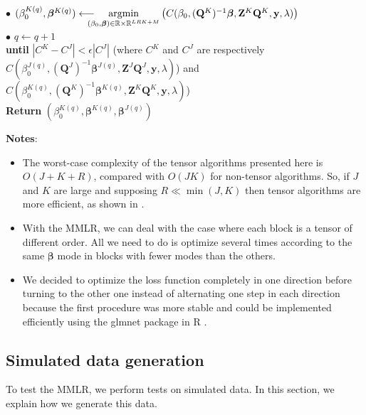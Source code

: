 \documentclass[preprint,12pt]{elsarticle}
\begin{document}
\begin{mdframed}[leftmargin=0cm, rightmargin=0.2cm]
    \phantom{a}\hspace{25 pt}  $\bullet$ $(\beta_0^{K {(q)}}, \bm{\beta}^{K {(q)}}) \longleftarrow \hspace{-10 pt} \underset{(\beta_0, \bm{\beta}) \in \mathbb{R} \times \mathbb{R}^{LRK + M}}{\text{argmin}} \left( C(\beta_0, (\mathbf{Q}^K)^{-1}\bm{\beta},\mathbf{Z}^K \mathbf{Q}^K, \mathbf{y}, \lambda) \right)$\\[2 pt]
    \phantom{a}\hspace{25 pt}  $\bullet$ $q \leftarrow q + 1$\\[4 pt]
    \phantom{a}\hspace{8 pt}  \textbf{until} $|C^K - C^J| < \epsilon |C^J| $ \; (where $C^K$ and $C^J$ are respectively\\[2 pt]
    \phantom{a}\hspace{42 pt} $C(\beta_0^{J {(q)}}, (\mathbf{Q}^J)^{-1}\bm{\beta}^{J {(q)}},\mathbf{Z}^J \mathbf{Q}^J, \mathbf{y}, \lambda)$) and $C(\beta_0^{K {(q)}}, (\mathbf{Q}^K)^{-1}\bm{\beta}^{K {(q)}},\mathbf{Z}^K \mathbf{Q}^K, \mathbf{y}, \lambda)$)\\ [8 pt]
    \textbf{Return} $(\beta_0^{K {(q)}},\bm{\beta}^{K(q)}, \bm{\beta}^{J(q)})$
\end{mdframed}

\vspace{5 pt}
\noindent \textbf{Notes}:
\begin{itemize}
    \item The worst-case complexity of the tensor algorithms presented here is $O(J + K + R)$, compared with $O(JK)$ for non-tensor algorithms. So, if $J$ and $K$ are large and supposing $R \ll \min(J,K)$ then tensor algorithms are more efficient, as shown in \cite{multi_rank_r}.
    \item With the MMLR, we can deal with the case where each block is a tensor of different order. All we need to do is optimize several times according to the same $\bm{\beta}$ mode in blocks with fewer modes than the others.
    \item We decided to optimize the loss function completely in one direction before turning to the other one instead of alternating one step in each direction because the first procedure was more stable and could be implemented efficiently using the glmnet package in R \cite{glmnet}.
\end{itemize}

\vspace{7 pt}


\subsection{Simulated data generation}
\label{sec:simulated_data}
\noindent To test the MMLR, we perform tests on simulated data. In this section, we explain how we generate this data.
\end{document}
